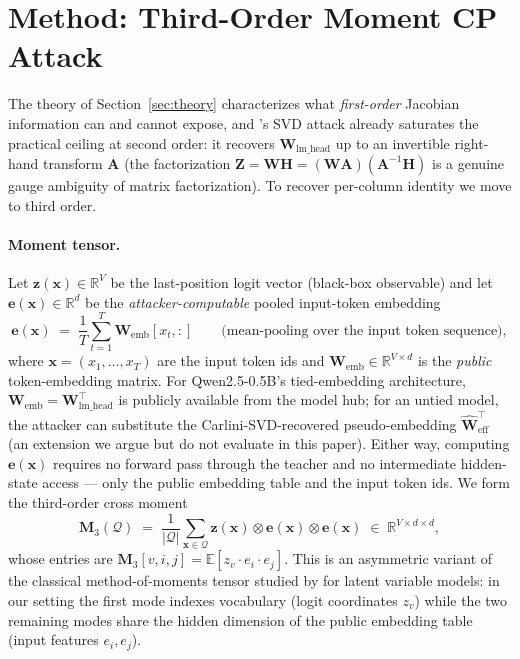 \documentclass{article}
\newcommand{\R}{\mathbb{R}}
\newcommand{\E}{\mathbb{E}}
\newcommand{\cQ}{\mathcal{Q}}
\newcommand{\bz}{\mathbf{z}}
\newcommand{\bx}{\mathbf{x}}
\newcommand{\bW}{\mathbf{W}}
\newcommand{\bH}{\mathbf{H}}
\newcommand{\bZ}{\mathbf{Z}}
\newcommand{\bM}{\mathbf{M}}
\newcommand{\bA}{\mathbf{A}}
\newcommand{\be}{\mathbf{e}}
\begin{document}
\section{Method: Third-Order Moment CP Attack}
\label{sec:method}

The theory of Section~\ref{sec:theory} characterizes what \emph{first-order} Jacobian information can and cannot expose, and \citet{carlini2024stealing}'s SVD attack already saturates the practical ceiling at second order: it recovers $\bW_{\text{lm\_head}}$ up to an invertible right-hand transform $\bA$ (the factorization $\bZ = \bW\bH = (\bW\bA)(\bA^{-1}\bH)$ is a genuine gauge ambiguity of matrix factorization). To recover per-column identity we move to third order.

\paragraph{Moment tensor.} Let $\bz(\bx) \in \R^V$ be the last-position logit vector (black-box observable) and let $\be(\bx) \in \R^d$ be the \emph{attacker-computable} pooled input-token embedding
\begin{equation}\label{eq:e-def}
 \be(\bx) \;=\; \frac{1}{T}\sum_{t=1}^{T} \bW_\text{emb}[x_t, :] \qquad\text{(mean-pooling over the input token sequence)},
\end{equation}
where $\bx = (x_1, \ldots, x_T)$ are the input token ids and $\bW_\text{emb} \in \R^{V \times d}$ is the \emph{public} token-embedding matrix. For Qwen2.5-0.5B's tied-embedding architecture, $\bW_\text{emb} = \bW_{\text{lm\_head}}^\top$ is publicly available from the model hub; for an untied model, the attacker can substitute the Carlini-SVD-recovered pseudo-embedding $\hat{\bW}_\text{eff}^\top$ (an extension we argue but do not evaluate in this paper). Either way, computing $\be(\bx)$ requires no forward pass through the teacher and no intermediate hidden-state access --- only the public embedding table and the input token ids. We form the third-order cross moment
\begin{equation}\label{eq:m3}
 \bM_3(\cQ) \;=\; \frac{1}{|\cQ|}\sum_{\bx \in \cQ} \bz(\bx) \otimes \be(\bx) \otimes \be(\bx) \;\in\; \R^{V \times d \times d},
\end{equation}
whose entries are $\bM_3[v, i, j] = \E[z_v \cdot e_i \cdot e_j]$. This is an asymmetric variant of the classical method-of-moments tensor studied by \citet{anandkumar2014tensor} for latent variable models: in our setting the first mode indexes vocabulary (logit coordinates $z_v$) while the two remaining modes share the hidden dimension of the public embedding table (input features $e_i, e_j$).
\end{document}
